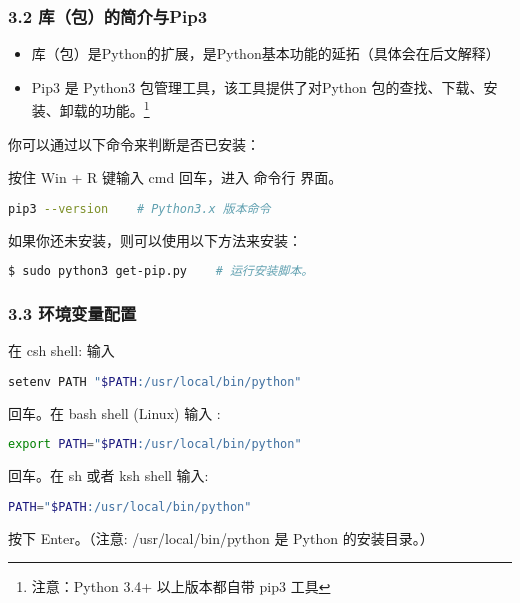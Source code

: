 \subsubsection{3.2 库（包）的简介与Pip3}

\begin{itemize}
\item 库（包）是Python的扩展，是Python基本功能的延拓（具体会在后文解释）
\item Pip3 是 Python3 包管理工具，该工具提供了对Python 包的查找、下载、安装、卸载的功能。\footnote{注意：Python 3.4+ 以上版本都自带 pip3 工具}
\end{itemize}

你可以通过以下命令来判断是否已安装：

按住 Win + R 键输入 cmd 回车，进入 命令行 界面。


\begin{lstlisting}[language=bash]
pip3 --version    # Python3.x 版本命令
\end{lstlisting}

如果你还未安装，则可以使用以下方法来安装：

\begin{lstlisting}[language=bash]
$ sudo python3 get-pip.py    # 运行安装脚本。
\end{lstlisting}

\subsubsection{3.3 环境变量配置}

在 csh shell: 输入

\begin{lstlisting}[language=bash]
setenv PATH "$PATH:/usr/local/bin/python"
\end{lstlisting}

回车。在 bash shell (Linux) 输入 :

\begin{lstlisting}[language=bash]
export PATH="$PATH:/usr/local/bin/python" 
\end{lstlisting}

回车。在 sh 或者 ksh shell 输入:

\begin{lstlisting}[language=bash]
PATH="$PATH:/usr/local/bin/python" 
\end{lstlisting}

按下 Enter。（注意: /usr/local/bin/python 是 Python 的安装目录。）



